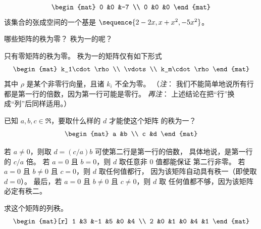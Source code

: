 \begin{exercises}
\begin{answer}
\begin{exparts}
\begin{multline*}
\begin{mat}
              0 &0  &-7 \\
              0 &0 &0
            \end{mat}
          \end{multline*}
          该集合的张成空间的一个基是
          $\sequence{2-2x, x+x^2, -5x^2}$。
      \end{exparts}
    \end{answer}
  \item
    哪些矩阵的秩为零？
    秩为一的呢？
    \begin{answer}
      只有零矩阵的秩为零。
      秩为一的矩阵仅有如下形式
      \begin{equation*}
        \begin{mat}
           k_1\cdot \rho  \\
            \vdots  \\
           k_m\cdot \rho
        \end{mat}
      \end{equation*}
      其中 \( \rho \) 是某个非零行向量，且诸 \( k_i \) 不全为零。
      （\textit{注}：
      我们不能简单地说所有行都是第一行的倍数，因为第一行可能是零行。
      \textit{再注}：
      上述结论在把“行”换成“列”后同样适用。）
    \end{answer}
  \recommended \item
    已知 \( a,b,c\in\Re \)，要取什么样的 \( d \) 才能使这个矩阵
    的秩为一？
    \begin{equation*}
      \begin{mat}
         a  &b  \\
         c  &d
      \end{mat}
    \end{equation*}
    \begin{answer}
      若 \( a\neq 0 \)，则取 \( d=(c/a)b \) 可使第二行是第一行的倍数，
      具体地说，是第一行的 \( c/a \) 倍。
      若 \( a=0 \) 且 \( b=0 \)，则 \( d \) 取任意非 \( 0 \) 值都能保证
      第二行非零。
      若 \( a=0 \) 且 \( b\neq 0 \) 且 \( c=0 \)，则 \( d \) 取任何值都行，
      因为该矩阵自动具有秩一（即使取 $d=0$）。
      最后，若 \( a=0 \) 且 \( b\neq 0 \) 且 \( c\neq 0 \)，则 \( d \) 取
      任何值都不够，因为该矩阵必定有秩二。
    \end{answer}
  \item
    求这个矩阵的列秩。
    \begin{equation*}
      \begin{mat}[r]
        1  &3  &-1  &5  &0  &4  \\
        2  &0  &1   &0  &4  &1

\end{mat}
\end{equation*}
\end{exercises}
